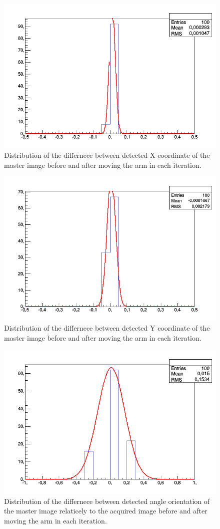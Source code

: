 \begin{figure}[ht]\centering
\includegraphics[width=0.8\linewidth]{Data/Precision_tests/Corner_c_x.png}
\caption{Distribution of the differnece between detected X coordinate of the master image before and after moving the arm in each iteration.}
\label{fig:corner_x}
\end{figure}

\begin{figure}[ht]\centering
\includegraphics[width=0.8\linewidth]{Data/Precision_tests/Corner_c_y.png}
\caption{Distribution of the differnece between detected Y coordinate of the master image before and after moving the arm in each iteration.}
\label{fig:corner_y}
\end{figure}

\begin{figure}[ht]\centering
\includegraphics[width=0.8\linewidth]{Data/Precision_tests/Corner_c_theta.png}
\caption{Distribution of the differnece between detected angle orientation of the master image relaticely to the acquired image before and after moving the arm in each iteration.}
\label{fig:corner_theta}
\end{figure}

